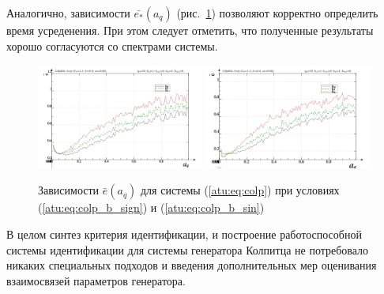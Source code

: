Аналогично, зависимости $\bar{e_*}(a_q)$ (рис.~\ref{atu:f:colp_e_a_q})
позволяют корректно определить время усреденения.
При этом следует отметить, что
полученные результаты хорошо согласуются со спектрами системы.

\begin{figure}[htb!]
\centerline{
  \includegraphics[width=0.49\textwidth]{p/cha/colp/colp_m5p-p_a_q_e_sign.png}
  \includegraphics[width=0.49\textwidth]{p/cha/colp/colp_m5p-p_a_q_e_sin.png}
}
  \caption{Зависимости  $\bar{e}(a_q)$ для системы (\ref{atu:eq:colp})
  при условиях (\ref{atu:eq:colp_b_sign}) и (\ref{atu:eq:colp_b_sin})
}
\label{atu:f:colp_e_a_q}
\end{figure}

В целом синтез критерия идентификации, и построение работоспособной системы идентификации для
системы генератора Колпитца не потребовало никаких специальных подходов и введения дополнительных
мер оценивания взаимосвязей параметров генератора.

